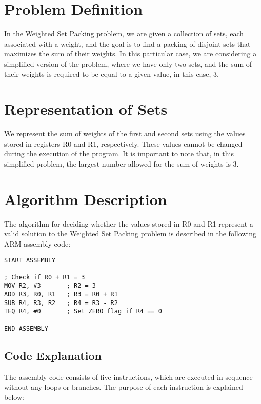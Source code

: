 \section{Problem Definition}

In the Weighted Set Packing problem, we are given a collection of sets, each associated with a weight, and the goal is to find a packing of disjoint sets that maximizes the sum of their weights. In this particular case, we are considering a simplified version of the problem, where we have only two sets, and the sum of their weights is required to be equal to a given value, in this case, 3.

\section{Representation of Sets}

We represent the sum of weights of the first and second sets using the values stored in registers R0 and R1, respectively. These values cannot be changed during the execution of the program. It is important to note that, in this simplified problem, the largest number allowed for the sum of weights is 3.

\section{Algorithm Description}

The algorithm for deciding whether the values stored in R0 and R1 represent a valid solution to the Weighted Set Packing problem is described in the following ARM assembly code:

\begin{verbatim}
START_ASSEMBLY

; Check if R0 + R1 = 3
MOV R2, #3       ; R2 = 3
ADD R3, R0, R1   ; R3 = R0 + R1
SUB R4, R3, R2   ; R4 = R3 - R2
TEQ R4, #0       ; Set ZERO flag if R4 == 0

END_ASSEMBLY
\end{verbatim}

\subsection{Code Explanation}

The assembly code consists of five instructions, which are executed in sequence without any loops or branches. The purpose of each instruction is explained below:

